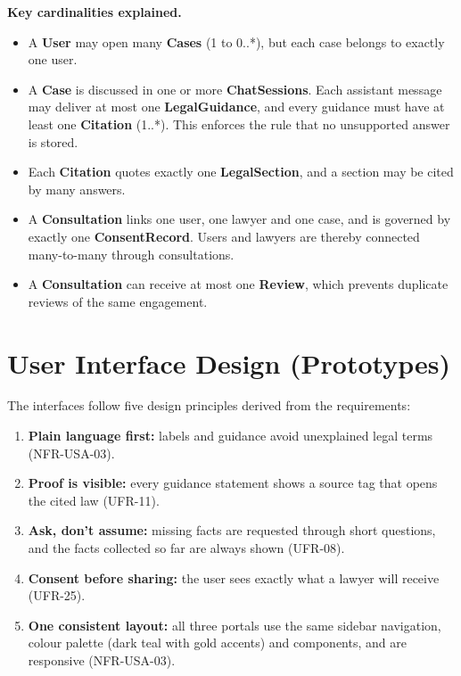 \textbf{Key cardinalities explained.}

\begin{itemize}
  \item A \textbf{User} may open many \textbf{Cases} (1 to 0..*), but each case belongs to exactly one user.
  \item A \textbf{Case} is discussed in one or more \textbf{ChatSessions}. Each assistant message may deliver at most one \textbf{LegalGuidance}, and every guidance must have at least one \textbf{Citation} (1..*). This enforces the rule that no unsupported answer is stored.
  \item Each \textbf{Citation} quotes exactly one \textbf{LegalSection}, and a section may be cited by many answers.
  \item A \textbf{Consultation} links one user, one lawyer and one case, and is governed by exactly one \textbf{ConsentRecord}. Users and lawyers are thereby connected many-to-many through consultations.
  \item A \textbf{Consultation} can receive at most one \textbf{Review}, which prevents duplicate reviews of the same engagement.
\end{itemize}

\section{User Interface Design (Prototypes)}

The interfaces follow five design principles derived from the requirements:

\begin{enumerate}
  \item \textbf{Plain language first:} labels and guidance avoid unexplained legal terms (NFR-USA-03).
  \item \textbf{Proof is visible:} every guidance statement shows a source tag that opens the cited law (UFR-11).
  \item \textbf{Ask, don't assume:} missing facts are requested through short questions, and the facts collected so far are always shown (UFR-08).
  \item \textbf{Consent before sharing:} the user sees exactly what a lawyer will receive (UFR-25).
  \item \textbf{One consistent layout:} all three portals use the same sidebar navigation, colour palette (dark teal with gold accents) and components, and are responsive (NFR-USA-03).
\end{enumerate}

